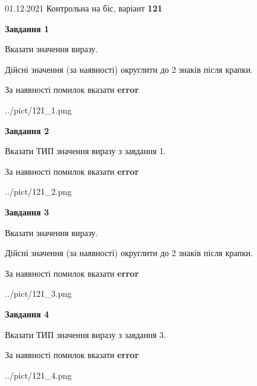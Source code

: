 \documentclass[11pt, ukrainian]{article}
\begin{document}
{01.12.2021 Контрольна на біс, варіант  \No \textbf { 121 }\par}
{
\begin {large}
{\begin {center}\textbf{Завдання 1}\end {center}}\par
Вказати значення виразу. \par
Дійсні значення (за наявності) округлити до 2 знаків після крапки. \par
За наявності помилок вказати \textbf{error}

\begin{center}
	{../pict/121_1.png}
\end{center}
\newpage

{\begin {center}\textbf{Завдання 2}\end {center}}\par
Вказати ТИП значення виразу з завдання 1. \par
За наявності помилок вказати \textbf{error}

\begin{center}
	{../pict/121_2.png}
\end{center}
\newpage

{\begin {center}\textbf{Завдання 3}\end {center}}\par
Вказати значення виразу. \par
Дійсні значення (за наявності) округлити до 2 знаків після крапки. \par
За наявності помилок вказати \textbf{error}

\begin{center}
	{../pict/121_3.png}
\end{center}
\newpage

{\begin {center}\textbf{Завдання 4}\end {center}}\par
Вказати ТИП значення виразу з завдання 3. \par
За наявності помилок вказати \textbf{error}

\begin{center}
	{../pict/121_4.png}
\end{center}
\newpage


\end{large}}
\end{document}
